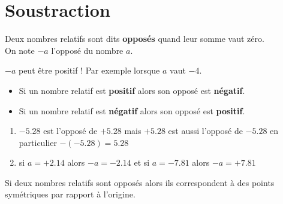 \section{Soustraction}

\begin{definition}
    Deux nombres relatifs sont dits \textbf{opposés} quand leur somme vaut zéro.\\
    On note $-a$ l'opposé du nombre $a$.
\end{definition}

\begin{remarque}
    $-a$ peut être positif ! Par exemple lorsque $a$ vaut $-4$.
\end{remarque}

\begin{propriete}[\admise]
    \vspace*{3mm}
    \begin{itemize}
        \item Si un nombre relatif est {\bfseries positif} alors son opposé est {\bfseries négatif}.
        \item Si un nombre relatif est {\bfseries négatif} alors son opposé est {\bfseries positif}.
    \end{itemize}
\end{propriete}

\begin{exemples*1}
    \begin{changemargin}{0mm}{-10mm}
        \begin{enumerate}
            \item $\num{-5.28}$ est l'opposé de $+\num{5.28}$ mais $+\num{5.28}$ est aussi l'opposé de $\num{-5.28}$ en particulier $-(\num{-5.28})=\num{5.28}$
            \item si $a=+\num{2.14}$ alors $-a=\num{-2.14}$ et si $a=\num{-7.81}$ alors $-a=+\num{7.81}$
        \end{enumerate}
    \end{changemargin}
    \vspace*{-10mm}
\end{exemples*1}

\begin{propriete}
    Si deux nombres relatifs sont opposés alors ils correspondent à des points symétriques par rapport à l'origine.
\end{propriete}

